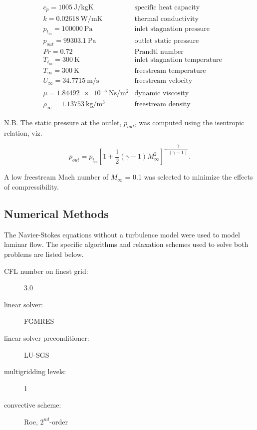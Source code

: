 \documentclass[12pt,letterpaper]{article}
\begin{document}
\begin{align*}
&c_p = \SI{1005}{\joule\per\kilogram\kelvin} & \text{specific heat capacity} \\
&k = \SI{0.02618}{\watt\per\meter\kelvin} & \text{thermal conductivity} \\
&p_{t_{in}} = \SI{100000}{\pascal} & \text{inlet stagnation pressure} \\
&p_{out} = \SI{99303.1}{\pascal} & \text{outlet static pressure} \\
&Pr = 0.72 &\text{Prandtl number} \\
&T_{t_{in}} = \SI{300}{\kelvin} & \text{inlet stagnation temperature} \\
&T_\infty = \SI{300}{\kelvin} & \text{freestream temperature} \\
&U_\infty = \SI{34.7715}{\meter\per\second} & \text{freestream velocity}\\
&\mu = \SI{1.84492e-5}{\newton\second\per\meter\squared} & \text{dynamic viscosity} \\
&\rho_\infty = \SI{1.13753}{\kilogram\per\meter\cubed} & \text{freestream density}
\end{align*}

N.B. The static pressure at the outlet, $p_{out}$, was computed using the isentropic relation, viz.

\begin{equation*}
p_{out} = p_{t_{in}}\left[ 1+\dfrac{1}{2}\left( \gamma-1\right) M_\infty^2 \right] ^{-\dfrac{\gamma}{\left( \gamma-1\right) }}.
\end{equation*}

A low freestream Mach number of $M_\infty$ = 0.1 was selected to minimize the effects of compressibility.

\subsection*{Numerical Methods}
The Navier-Stokes equations without a turbulence model were used to model laminar flow. The specific algorithms and relaxation schemes used to solve both problems are listed below.

\begin{description}
\item[CFL number on finest grid:] 3.0
\item[linear solver:] FGMRES
\item[linear solver preconditioner:] LU-SGS
\item[multigridding levels:] 1
\item[convective scheme:] Roe, $2^{nd}$-order
\end{description}
\end{document}
